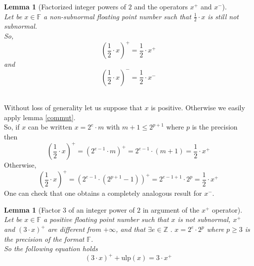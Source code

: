 \documentclass[a4paper,10pt,twoside]{article}
\newtheorem{lemma}[theorem]{Lemma}
\newenvironment{proof}[1][Proof]{\begin{trivlist}
\item[\hskip \labelsep {\bfseries #1}]}{\end{trivlist}}
\newcommand{\qed}{\nobreak \ifvmode \relax \else \ifdim \lastskip<1.5em \hskip-\lastskip
\hskip1.5em plus0em minus0.5em \fi \nobreak \vrule height0.75em width0.5em depth0.25em\fi}
\newcommand{\Z}{\ensuremath{\mathbb {Z}}}
\newcommand{\F}{\ensuremath{\mathbb {F}}}
\newcommand{\mUlp}{\ensuremath{\mathrm{ulp}}}
\begin{document}
\begin{lemma}[Factorized integer powers of $2$ and the operators $x^+$ and $x^-$] \label{multhalf} ~\\
Let be $x \in \F$ a non-subnormal floating point number such that $\frac{1}{2} \cdot x$ is still not subnormal.\\
So,
$$\left(\frac{1}{2} \cdot x \right)^+ = \frac{1}{2} \cdot x^+$$
and
$$\left(\frac{1}{2} \cdot x \right)^- = \frac{1}{2} \cdot x^-$$
\end{lemma}
\begin{proof} ~ \\
Without loss of generality let us suppose that $x$ is positive. Otherwise we easily apply lemma \ref{commut}. \\
So, if $x$ can be written $x = 2^e \cdot m$ with $m + 1 \leq 2^{p+1}$ where $p$ is the precision then
$$\left( \frac{1}{2} \cdot x \right)^+ = \left( 2^{e-1} \cdot m \right)^+ = 2^{e-1} \cdot \left(m+1\right) = \frac{1}{2} \cdot x^+$$
Otherwise, 
$$\left( \frac{1}{2} \cdot x \right)^+ = \left( 2^{e-1} \cdot \left( 2^{p+1} -1 \right) \right)^+ 
= 2^{e-1+1} \cdot 2^p = \frac{1}{2} \cdot x^+$$
One can check that one obtains a completely analogous result for $x^-$.\qed
\end{proof}
\begin{lemma}[Factor $3$ of an integer power of $2$ in argument of the $x^+$ operator] \label{succtroisfoispuissdeux} ~ \\
Let be $x \in \F$ a positive floating point number such that $x$ is not subnormal, $x^+$ and $\left( 3 \cdot x \right)^+$ 
are different from $+\infty$, and that $\exists e \in \Z \mbox{ . } x = 2^e \cdot 2^p$ where $p \geq 3$ is the precision
of the format $\F$.\\
So the following equation holds
$$\left( 3 \cdot x \right)^+ + \mUlp\left( x \right) = 3 \cdot x^+$$
\end{lemma}
\end{document}
